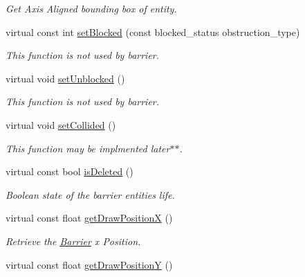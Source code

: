 \begin{DoxyCompactItemize}
\begin{DoxyCompactList}\small\item\em Get Axis Aligned bounding box of entity. \end{DoxyCompactList}\item 
\hypertarget{class_barrier_acff61ab4742c427abdf0d46abd52c832}{virtual const int \hyperlink{class_barrier_acff61ab4742c427abdf0d46abd52c832}{set\+Blocked} (const blocked\+\_\+status obstruction\+\_\+type)}\label{class_barrier_acff61ab4742c427abdf0d46abd52c832}

\begin{DoxyCompactList}\small\item\em This function is not used by barrier. \end{DoxyCompactList}\item 
\hypertarget{class_barrier_a863ef65ef677abdcf97373157f86c138}{virtual void \hyperlink{class_barrier_a863ef65ef677abdcf97373157f86c138}{set\+Unblocked} ()}\label{class_barrier_a863ef65ef677abdcf97373157f86c138}

\begin{DoxyCompactList}\small\item\em This function is not used by barrier. \end{DoxyCompactList}\item 
\hypertarget{class_barrier_adeedae22d7df279613359026ecf9f279}{virtual void \hyperlink{class_barrier_adeedae22d7df279613359026ecf9f279}{set\+Collided} ()}\label{class_barrier_adeedae22d7df279613359026ecf9f279}

\begin{DoxyCompactList}\small\item\em This function may be implmented later$\ast$$\ast$. \end{DoxyCompactList}\item 
virtual const bool \hyperlink{class_barrier_a8199ad8a6f070435da55832bdd3893b8}{is\+Deleted} ()
\begin{DoxyCompactList}\small\item\em Boolean state of the barrier entities life. \end{DoxyCompactList}\item 
\hypertarget{class_barrier_a53317aaef27996362c933d65914d663c}{virtual const float \hyperlink{class_barrier_a53317aaef27996362c933d65914d663c}{get\+Draw\+Position\+X} ()}\label{class_barrier_a53317aaef27996362c933d65914d663c}

\begin{DoxyCompactList}\small\item\em Retrieve the \hyperlink{class_barrier}{Barrier} x Position. \end{DoxyCompactList}\item 
\hypertarget{class_barrier_af90c9b4b6f28c7710637ccda7148fbd4}{virtual const float \hyperlink{class_barrier_af90c9b4b6f28c7710637ccda7148fbd4}{get\+Draw\+Position\+Y} ()}\label{class_barrier_af90c9b4b6f28c7710637ccda7148fbd4}


\end{DoxyCompactItemize}
